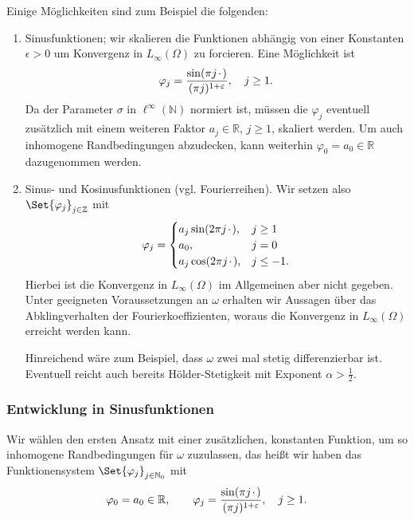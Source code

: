 Einige Möglichkeiten sind zum Beispiel die folgenden:
\begin{enumerate}
    \item Sinusfunktionen; wir skalieren die Funktionen abhängig von einer Konstanten $\epsilon > 0$ um Konvergenz in $L_{\infty}(\Omega)$ zu forcieren.
    Eine Möglichkeit ist
    \begin{equation}
        \varphi_{j} = \frac{\sin(\pi j {\mkern2mu\cdot\mkern2mu})}{(\pi j)^{1 + \varepsilon}}, \quad j \geq 1.
    \end{equation}
    Da der Parameter $\sigma$ in $\ell^{\infty}(\mathbb{N})$ normiert ist, müssen die $\varphi_{j}$ eventuell zusätzlich mit einem weiteren Faktor $a_{j} \in \mathbb{R}$, $j \geq 1$, skaliert werden.
    Um auch inhomogene Randbedingungen abzudecken, kann weiterhin $\varphi_{0} = a_{0} \in \mathbb{R}$ dazugenommen werden.
    \item Sinus- und Kosinusfunktionen (vgl. Fourierreihen).
    Wir setzen also $\Set{ \varphi_{j} }_{j \in \mathbb{Z}}$ mit
    \begin{equation}
        \varphi_{j} = \begin{cases}
            a_{j} \sin(2 \pi j {\mkern2mu\cdot\mkern2mu}),    &j \geq 1 \\
            a_{0},                      &j = 0 \\
            a_{j} \cos(2 \pi j {\mkern2mu\cdot\mkern2mu}),    &j \leq -1.
        \end{cases}
    \end{equation}
    Hierbei ist die Konvergenz in $L_{\infty}(\Omega)$ im Allgemeinen aber nicht gegeben.
    Unter geeigneten Voraussetzungen an $\omega$ erhalten wir Aussagen über das Abklingverhalten der Fourierkoeffizienten, woraus die Konvergenz in $L_{\infty}(\Omega)$ erreicht werden kann.

    Hinreichend wäre zum Beispiel, dass $\omega$ zwei mal stetig differenzierbar ist.
    Eventuell reicht auch bereits Hölder-Stetigkeit mit Exponent $\alpha > \frac{1}{2}$.
\end{enumerate}

\subsubsection{Entwicklung in Sinusfunktionen} %
\label{ssub:entwicklung_in_sinusfunktionen}


Wir wählen den ersten Ansatz mit einer zusätzlichen, konstanten Funktion, um so inhomogene Randbedingungen für $\omega$ zuzulassen, das heißt wir haben das Funktionensystem $\Set{ \varphi_{j} }_{j \in \mathbb{N}_{0}}$ mit
\begin{equation}
    \label{eq:sinusfunktionen_ansatz}
    \varphi_{0} = a_{0} \in \mathbb{R}, \qquad
    \varphi_{j} = \frac{\sin(\pi j {\mkern2mu\cdot\mkern2mu})}{(\pi j)^{1 + \varepsilon}}, \quad j \geq 1.
\end{equation}

